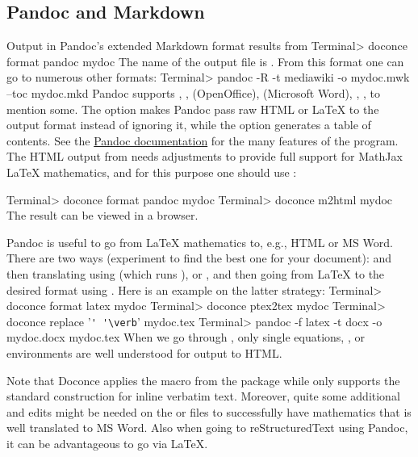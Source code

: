 \documentclass[%
oneside,                 %
final,                   %
10pt]{article}
\begin{document}
\subsection{Pandoc and Markdown}

Output in Pandoc's extended Markdown format results from
\bsys
Terminal> doconce format pandoc mydoc
\esys
The name of the output file is .
From this format one can go to numerous other formats:
\bsys
Terminal> pandoc -R -t mediawiki -o mydoc.mwk --toc mydoc.mkd
\esys
Pandoc supports , ,  (OpenOffice),  (Microsoft
Word), , , to mention some. The  option makes
Pandoc pass raw HTML or {\LaTeX} to the output format instead of ignoring it,
while the  option generates a table of contents.
See the \href{{http://johnmacfarlane.net/pandoc/README.html}}{Pandoc documentation}
for the many features of the  program. The HTML output from
 needs adjustments to provide full support for MathJax {\LaTeX}
mathematics, and for this purpose one should use :

\bsys
Terminal> doconce format pandoc mydoc
Terminal> doconce m2html mydoc
\esys
The result  can be viewed in a browser.

Pandoc is useful to go from {\LaTeX} mathematics to, e.g., HTML or MS
Word.  There are two ways (experiment to find the best one for your
document):  and then translating using  (which runs ), or , and then
going from {\LaTeX} to the desired format using .
Here is an example on the latter strategy:
\bsys
Terminal> doconce format latex mydoc
Terminal> doconce ptex2tex mydoc
Terminal> doconce replace '\Verb!' '\verb!' mydoc.tex
Terminal> pandoc -f latex -t docx -o mydoc.docx mydoc.tex
\esys
When we go through , only single equations, , or 
environments are well understood for output to HTML.

Note that Doconce applies the  macro from the  package
while  only supports the standard  construction for
inline verbatim text.  Moreover, quite some additional  and  edits might be needed on the  or
 files to successfully have mathematics that is well translated
to MS Word.  Also when going to reStructuredText using Pandoc, it can
be advantageous to go via {\LaTeX}.
\end{document}

